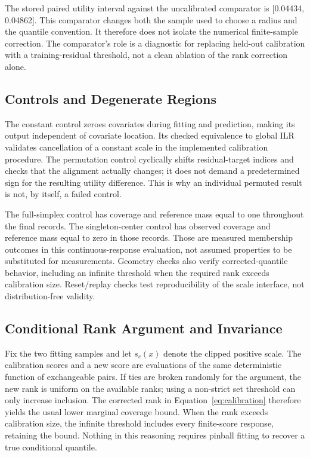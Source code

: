 \documentclass{article}
\begin{document}
The stored paired utility interval against the uncalibrated comparator is [0.04434, 0.04862]. This comparator changes both the sample used to choose a radius and the quantile convention. It therefore does not isolate the numerical finite-sample correction. The comparator's role is a diagnostic for replacing held-out calibration with a training-residual threshold, not a clean ablation of the rank correction alone.

\subsection{Controls and Degenerate Regions}
The constant control zeroes covariates during fitting and prediction, making its output independent of covariate location. Its checked equivalence to global ILR validates cancellation of a constant scale in the implemented calibration procedure. The permutation control cyclically shifts residual-target indices and checks that the alignment actually changes; it does not demand a predetermined sign for the resulting utility difference. This is why an individual permuted result is not, by itself, a failed control.

The full-simplex control has coverage and reference mass equal to one throughout the final records. The singleton-center control has observed coverage and reference mass equal to zero in those records. Those are measured membership outcomes in this continuous-response evaluation, not assumed properties to be substituted for measurements. Geometry checks also verify corrected-quantile behavior, including an infinite threshold when the required rank exceeds calibration size. Reset/replay checks test reproducibility of the scale interface, not distribution-free validity.

\subsection{Conditional Rank Argument and Invariance}
Fix the two fitting samples and let $s_c(x)$ denote the clipped positive scale. The calibration scores and a new score are evaluations of the same deterministic function of exchangeable pairs. If ties are broken randomly for the argument, the new rank is uniform on the available ranks; using a non-strict set threshold can only increase inclusion. The corrected rank in Equation~\ref{eq:calibration} therefore yields the usual lower marginal coverage bound. When the rank exceeds calibration size, the infinite threshold includes every finite-score response, retaining the bound. Nothing in this reasoning requires pinball fitting to recover a true conditional quantile.
\end{document}

